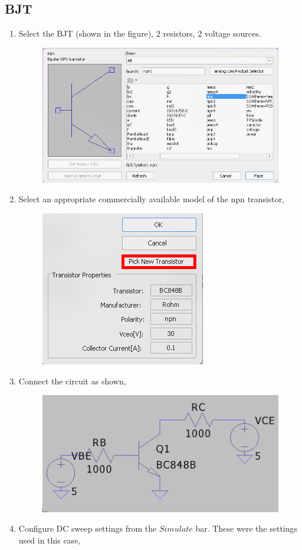 \documentclass[12pt,a4paper]{report}
\begin{document}
\subsection{BJT}
\begin{enumerate}
    \item Select the BJT (shown in the figure), 2 resistors, 2 voltage sources.
    \pagebreak
    \begin{figure}[h!]
        \centering
        \includegraphics[width = 0.6\linewidth]{Simluations/Experiment_1/figs/component-bjt.png}
        \label{fig:placeholder}
    \end{figure}
    \item Select an appropriate commercially available model of the npn transistor,
    \begin{figure}[h!]
        \centering
        \includegraphics[width=0.5\linewidth]{Simluations/Experiment_1/figs/bjt-model.png}
        \label{fig:placeholder}
    \end{figure}
    \item Connect the circuit as shown,
    \begin{figure}[h!]
        \centering
        \includegraphics[width=0.5\linewidth]{Simluations/Experiment_1/figs/bjt-circuit.png}
        \label{fig:placeholder}
    \end{figure}
    \item Configure DC sweep settings from the $Simulate$ bar. These were the settings used in this case,
  \begin{figure}[h!]
  \centering
  

\end{figure}
\end{enumerate}
\end{document}
